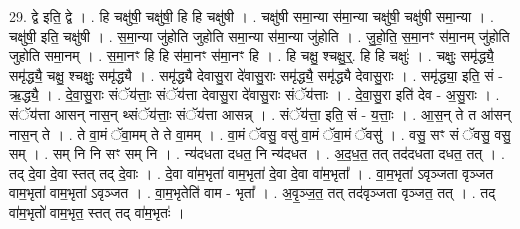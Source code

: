 \documentclass[17pt]{extarticle}
\begin{document}
29. द्वे इति॒ द्वे । . हि चक्षु॑षी॒ चक्षु॑षी॒ हि हि चक्षु॑षी । . चक्षु॑षी समा॒न्या स॑मा॒न्या चक्षु॑षी॒ चक्षु॑षी समा॒न्या । . चक्षु॑षी॒ इति॒ चक्षु॑षी । . स॒मा॒न्या जु॑होति जुहोति समा॒न्या स॑मा॒न्या जु॑होति । . जु॒हो॒ति॒ स॒मा॒नꣳ स॑मा॒नम् जु॑होति जुहोति समा॒नम् । . स॒मा॒नꣳ हि हि स॑मा॒नꣳ स॑मा॒नꣳ हि । . हि चक्षु॒ श्चक्षु॒र्॒. हि हि चक्षुः॑ । . चक्षुः॒ समृ॑द्ध्यै॒ समृ॑द्ध्यै॒ चक्षु॒ श्चक्षुः॒ समृ॑द्ध्यै । . समृ॑द्ध्यै देवासु॒रा दे॑वासु॒राः समृ॑द्ध्यै॒ समृ॑द्ध्यै देवासु॒राः । . समृ॑द्ध्या॒ इति॒ सं - ऋ॒द्ध्यै॒ । . दे॒वा॒सु॒राः संॅय॑त्ताः॒ संॅय॑त्ता देवासु॒रा दे॑वासु॒राः संॅय॑त्ताः । . दे॒वा॒सु॒रा इति॑ देव - अ॒सु॒राः । . संॅय॑त्ता आसन् नास॒न् थ्संॅय॑त्ताः॒ संॅय॑त्ता आसन्न् । . संॅय॑त्ता॒ इति॒ सं - य॒त्ताः॒ । . आ॒स॒न् ते त आ॑सन् नास॒न् ते । . ते वा॒मं ॅवा॒मम् ते ते वा॒मम् । . वा॒मं ॅवसु॒ वसु॑ वा॒मं ॅवा॒मं ॅवसु॑ । . वसु॒ सꣳ सं ॅवसु॒ वसु॒ सम् । . सम् नि नि सꣳ सम् नि । . न्य॑दधता दधत॒ नि न्य॑दधत । . अ॒द॒ध॒त॒ तत् तद॑दधता दधत॒ तत् । . तद् दे॒वा दे॒वा स्तत् तद् दे॒वाः । . दे॒वा वा॑म॒भृता॑ वाम॒भृता॑ दे॒वा दे॒वा वा॑म॒भृता᳚ । . वा॒म॒भृता॑ ऽवृञ्जता वृञ्जत वाम॒भृता॑ वाम॒भृता॑ ऽवृञ्जत । . वा॒म॒भृतेति॑ वाम - भृता᳚ । . अ॒वृ॒ञ्ज॒त॒ तत् तद॑वृञ्जता वृञ्जत॒ तत् । . तद् वा॑म॒भृतो॑ वाम॒भृत॒ स्तत् तद् वा॑म॒भृतः॑ । \newline
\end{document}
